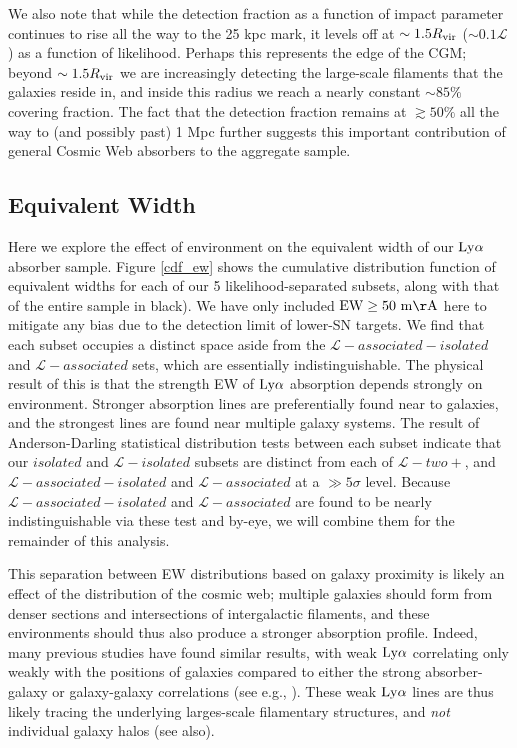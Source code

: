 \documentclass[twocolumn,tighten]{aastex62}
\begin{document}
We also note that while the detection fraction as a function of impact parameter continues to rise all the way to the 25 kpc mark, it levels off at $\sim 1.5 R_{\rm vir}$ ($\sim 0.1 \mathcal{L}$) as a function of likelihood. Perhaps this represents the edge of the CGM; beyond $\sim 1.5 R_{\rm vir}$ we are increasingly detecting the large-scale filaments that the galaxies reside in, and inside this radius we reach a nearly constant $\sim85\%$ covering fraction. The fact that the detection fraction remains at $\gtrsim 50\%$ all the way to (and possibly past) 1 Mpc further suggests this important contribution of general Cosmic Web absorbers to the aggregate sample.


\subsection{Equivalent Width}


Here we explore the effect of environment on the equivalent width of our $\rm Ly\alpha$ absorber sample. Figure \ref{cdf_ew} shows the cumulative distribution function of equivalent widths for each of our 5 likelihood-separated subsets, along with that of the entire sample in black). We have only included $\rm EW \ge 50~m\AA$ here to mitigate any bias due to the detection limit of lower-SN targets. We find that each subset occupies a distinct space aside from the $\mathcal{L}-associated-isolated$ and $\mathcal{L}-associated$ sets, which are essentially indistinguishable. The physical result of this is that the strength EW of $\rm Ly\alpha$ absorption depends strongly on environment. Stronger absorption lines are preferentially found near to galaxies, and the strongest lines are found near multiple galaxy systems. The result of Anderson-Darling statistical distribution tests between each subset indicate that our $isolated$ and $\mathcal{L}-isolated$ subsets are distinct from each of $\mathcal{L}-two+$, and $\mathcal{L}-associated-isolated$ and $\mathcal{L}-associated$ at a $\gg 5 \sigma$ level. Because $\mathcal{L}-associated-isolated$ and $\mathcal{L}-associated$ are found to be nearly indistinguishable via these test and by-eye, we will combine them for the remainder of this analysis.


This separation between EW distributions based on galaxy proximity is likely an effect of the distribution of the cosmic web; multiple galaxies should form from denser sections and intersections of intergalactic filaments, and these environments should thus also produce a stronger absorption profile. Indeed, many previous studies have found similar results, with weak $\rm Ly\alpha$ correlating only weakly with the positions of galaxies compared to either the strong absorber-galaxy or galaxy-galaxy correlations (see e.g., \citealt{chen2005, morris2006, wilman2007, chen2009}). These weak $\rm Ly\alpha$ lines are thus likely tracing the underlying larges-scale filamentary structures, and \emph{not} individual galaxy halos (see \citealt{tripp1998, wakker2015} also).
\end{document}
